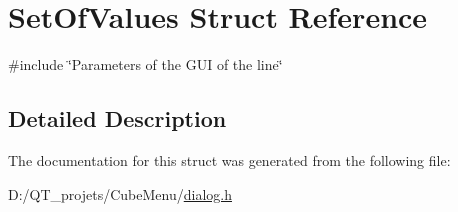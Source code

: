 \hypertarget{struct_set_of_values}{}\section{Set\+Of\+Values Struct Reference}
\label{struct_set_of_values}


{\ttfamily \#include \char`\"{}Parameters of the G\+U\+I of the line\char`\"{}}



\subsection{Detailed Description}


The documentation for this struct was generated from the following file\+:\begin{DoxyCompactItemize}
\item 
D\+:/\+Q\+T\+\_\+projets/\+Cube\+Menu/\hyperlink{dialog_8h}{dialog.\+h}\end{DoxyCompactItemize}
